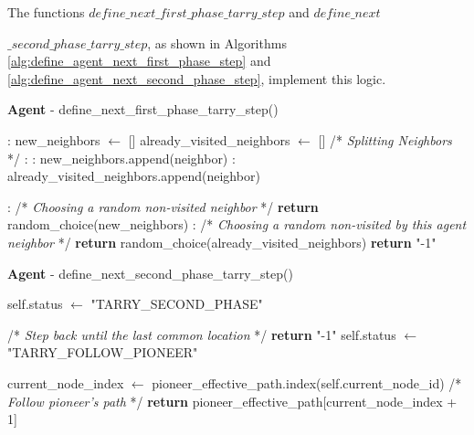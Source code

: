 The functions $define\_next\_first\_phase\_tarry\_step$ and $define\_next$

$\_second\_phase\_tarry\_step$, as shown in Algorithms \ref{alg:define_agent_next_first_phase_step} and \ref{alg:define_agent_next_second_phase_step}, implement this logic.

\begin{algorithm}
\caption{\textbf{Agent} - define\_next\_first\_phase\_tarry\_step()}
\label{alg:define_agent_next_first_phase_step}
\begin{algorithmic}
    :
    \State new\_neighbors $\gets$ [] 
    \State already\_visited\_neighbors $\gets$ []
    \State /* \textit{Splitting Neighbors } */
    :
        :
            \State new\_neighbors.append(neighbor)
        :
            \State already\_visited\_neighbors.append(neighbor)
        \EndIf
    \EndFor


    :
        \State /* \textit{Choosing a random non-visited neighbor } */
        \State \textbf{return} random\_choice(new\_neighbors)
    :
        \State /* \textit{Choosing a random non-visited by this agent neighbor } */
        \State \textbf{return} random\_choice(already\_visited\_neighbors)
    \EndIf
    \State \textbf{return} "-1" 
    \EndProcedure
\end{algorithmic}
\end{algorithm}


\begin{algorithm}
\caption{\textbf{Agent} - define\_next\_second\_phase\_tarry\_step()}
\label{alg:define_agent_next_second_phase_step}
\begin{algorithmic}
            \State self.status $\gets$ "TARRY\_SECOND\_PHASE"
        \EndIf
        
                \State /* \textit{Step back until the last common location } */
                \State \textbf{return} "-1"
            \Else
                \State self.status $\gets$ "TARRY\_FOLLOW\_PIONEER"
            \EndIf
        \EndIf

        current\_node\_index $\gets$ pioneer\_effective\_path.index(self.current\_node\_id)
        \State /* \textit{Follow pioneer's path} */
        \State \textbf{return} pioneer\_effective\_path[current\_node\_index + 1]
    \EndProcedure
\end{algorithmic}
\end{algorithm}


